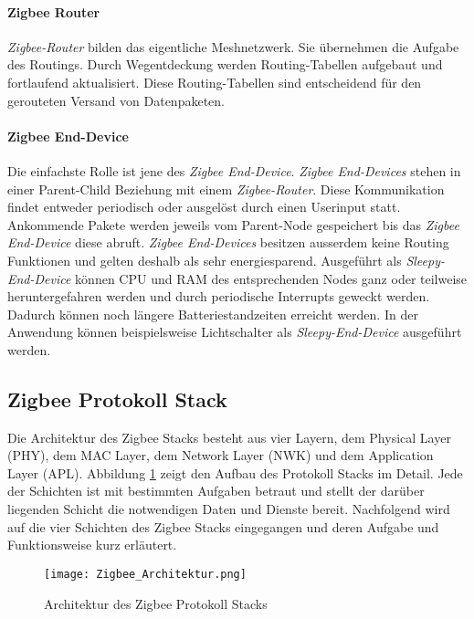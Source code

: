 \paragraph{Zigbee Router}
\textit{Zigbee-Router} bilden das eigentliche Meshnetzwerk.
Sie übernehmen die Aufgabe des Routings.
Durch Wegentdeckung werden Routing-Tabellen aufgebaut und fortlaufend aktualisiert.
Diese Routing-Tabellen sind entscheidend für den gerouteten Versand von Datenpaketen.

\paragraph{Zigbee End-Device}
Die einfachste Rolle ist jene des \textit{Zigbee End-Device}. \textit{Zigbee End-Devices} stehen in einer Parent-Child Beziehung mit einem \textit{Zigbee-Router}.
Diese Kommunikation findet entweder periodisch oder ausgelöst durch einen Userinput statt.
Ankommende Pakete werden jeweils vom Parent-Node gespeichert bis das \textit{Zigbee End-Device} diese abruft.
\textit{Zigbee End-Devices} besitzen ausserdem keine Routing Funktionen und gelten deshalb als sehr energiesparend.
Ausgeführt als \textit{Sleepy-End-Device} können CPU und RAM des entsprechenden Nodes ganz oder teilweise heruntergefahren werden und durch periodische Interrupts geweckt werden.
Dadurch können noch längere Batteriestandzeiten erreicht werden.
In der Anwendung können beispielsweise Lichtschalter als \textit{Sleepy-End-Device} ausgeführt werden. \cite{markus_krause_rainer_konrad_zigbee_2014}


\subsection{Zigbee Protokoll Stack}\label{subsec:ZigbeeProtokollStack}
Die Architektur des Zigbee Stacks besteht aus vier Layern, dem Physical Layer (PHY), dem MAC Layer, dem Network Layer (NWK) und dem Application Layer (APL).
Abbildung \ref{fig:ArchitekturdesZigbeeProtokollStacks} zeigt den Aufbau des Protokoll Stacks im Detail.
Jede der Schichten ist mit bestimmten Aufgaben betraut und stellt der darüber liegenden Schicht die notwendigen Daten und Dienste bereit.
Nachfolgend wird auf die vier Schichten des Zigbee Stacks eingegangen und deren Aufgabe und Funktionsweise kurz erläutert.

\begin{figure}[h]
	\centering
	\texttt{[image: Zigbee\_Architektur.png]}
	\caption{Architektur des Zigbee Protokoll Stacks}
	\label{fig:ArchitekturdesZigbeeProtokollStacks}
\end{figure}

